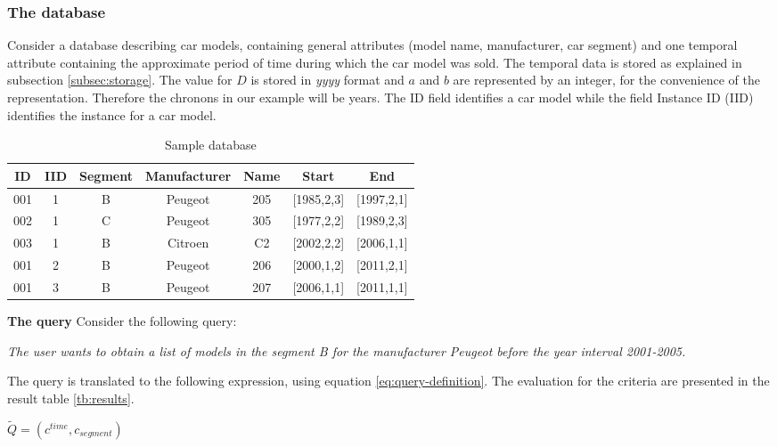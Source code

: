 \subsubsection{The database}
Consider a database describing car models, containing general attributes (model name, manufacturer, car segment) and one temporal attribute containing the approximate period of time during which the car model was sold. The temporal data is stored as explained in subsection \ref{subsec:storage}. The value for $D$ is stored in \emph{yyyy} format and $a$ and $b$ are represented by an integer, for the convenience of the representation. Therefore the chronons in our example will be years. The ID field identifies a car model while the field Instance ID (IID) identifies the instance for a car model.
\begin{table}[ht]
\centering
\begin{tabular}{c c c c c c c}
\hline
ID & IID & Segment & Manufacturer & Name & Start & End  \\ [0.5ex]
\hline
001 & 1 & B & Peugeot & 205 & [1985,2,3] & [1997,2,1] \\
002 & 1 & C & Peugeot & 305 & [1977,2,2] & [1989,2,3] \\
003 & 1 & B & Citroen & C2 & [2002,2,2] & [2006,1,1] \\
001 & 2 & B & Peugeot & 206 & [2000,1,2] & [2011,2,1] \\
001 & 3 & B & Peugeot & 207 & [2006,1,1] & [2011,1,1]\\
\hline
\end{tabular}
\vspace{10pt}
\caption{Sample database}
\label{tb:car-models}
\end{table}



\textbf{The query}
Consider the following query:

\emph{The user wants to obtain a list of models in the segment B for the manufacturer Peugeot before the year interval 2001-2005.}

The query is translated to the following expression, using equation \eqref{eq:query-definition}. The evaluation for the criteria are presented in the result table \ref{tb:results}.

\begin{center}
$\tilde{Q} = \left(  c^{time}, c_{segment} \right)$
\end{center}

